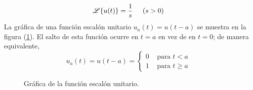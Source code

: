 \begin{equation}
\mathscr{L} \{ u(t) \} = \dfrac{1}{s} \hspace{0.5cm} (s > 0)
\label{eq:020}
\end{equation}
La gráfica de una función escalón unitario $u_{a}(t) = u(t - a)$ se muestra en la figura (\ref{fig:figura_003}). El salto de esta función ocurre en $t = a$ en vez de en $t = 0$; de manera equivalente,
\begin{equation}
u_{a}(t) = u (t - a) = \begin{cases}
0 & \mbox{ para } t < a \\
1 & \mbox{ para } t \geq a
\end{cases}
\end{equation}
\begin{figure}[H]
\centering

\caption{Gráfica de la función escalón unitario.}
\label{fig:figura_003}
\end{figure}
